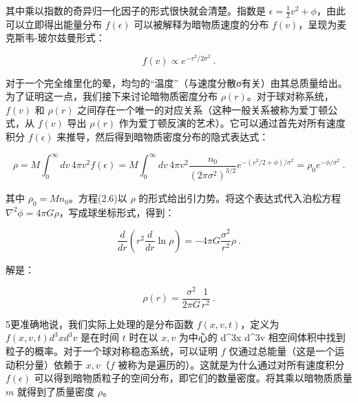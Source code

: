 其中乘以指数的奇异归一化因子的形式很快就会清楚。指数是 \(\epsilon = \frac{1}{2}v^2 + \phi\)，由此可以立即得出能量分布 \(f(\epsilon)\) 可以被解释为暗物质速度的分布 \(f(v)\)，呈现为麦克斯韦-玻尔兹曼形式：

\[ f(v) \propto e^{-v^2/2\sigma^2}~. \]

对于一个完全维里化的晕，均匀的“温度”（与速度分散σ有关）由其总质量给出。为了证明这一点，我们接下来讨论暗物质密度分布 \(\rho(r)\)。对于球对称系统，\(f(v)\) 和 \(\rho(r)\) 之间存在一个唯一的对应关系（这种一般关系被称为爱丁顿公式，从 \(f(v)\) 导出 \(\rho(r)\) 作为爱丁顿反演的艺术）。它可以通过首先对所有速度积分 \(f(\epsilon)\) 来推导，然后得到暗物质密度分布的隐式表达式：

\[ \rho = M \int_0^\infty dv \, 4\pi v^2 f(\epsilon) = M \int_0^\infty dv \, 4\pi v^2 \frac{n_0}{(2\pi\sigma^2)^{3/2}} e^{-(v^2/2+\phi)/\sigma^2} = \rho_0 e^{-\phi/\sigma^2}~. \]

其中 \(\rho_0 = Mn_0\)。方程(2.6)以 \(\rho\) 的形式给出引力势。将这个表达式代入泊松方程 \(\nabla^2\phi = 4\pi G\rho\)，写成球坐标形式，得到：

\[ \frac{d}{dr} \left( r^2 \frac{d}{dr} \ln\rho \right) = -4\pi G \frac{\sigma^2}{r^2} \rho~. \]

解是：

\[ \rho(r) = \frac{\sigma^2}{2\pi G} \frac{1}{r^2}~. \]

5更准确地说，我们实际上处理的是分布函数 \(f(x, v, t)\)，定义为 \(f(x, v, t) d^3x d^3v\) 是在时间 \(t\) 时在以 \(x, v\) 为中心的 d^3x d^3v 相空间体积中找到粒子的概率。对于一个球对称稳态系统，可以证明 \(f\) 仅通过总能量（这是一个运动积分量）依赖于 \(x, v\)（\(f\) 被称为是遍历的）。这就是为什么通过对所有速度积分 \(f(\epsilon)\) 可以得到暗物质粒子的空间分布，即它们的数量密度。将其乘以暗物质质量 \(m\) 就得到了质量密度 \(\rho\)。
 



